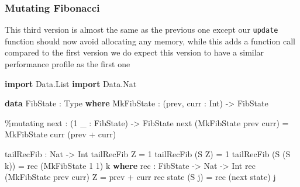\documentclass[
]{article}
\newenvironment{Shaded}{}{}
\newcommand{\DataTypeTok}[1]{\textcolor[rgb]{0.56,0.13,0.00}{#1}}
\newcommand{\DecValTok}[1]{\textcolor[rgb]{0.25,0.63,0.44}{#1}}
\newcommand{\KeywordTok}[1]{\textcolor[rgb]{0.00,0.44,0.13}{\textbf{#1}}}
\newcommand{\NormalTok}[1]{#1}
\newcommand{\OperatorTok}[1]{\textcolor[rgb]{0.40,0.40,0.40}{#1}}
\newcommand{\OtherTok}[1]{\textcolor[rgb]{0.00,0.44,0.13}{#1}}
\begin{document}
\hypertarget{mutating-fibonacci}{%
\subsubsection{Mutating Fibonacci}\label{mutating-fibonacci}}

This third version is almost the same as the previous one except our
\texttt{update} function should now avoid allocating any memory, while
this adds a function call compared to the first version we do expect
this version to have a similar performance profile as the first one

\begin{Shaded}
\begin{Highlighting}[]
\KeywordTok{import} \DataTypeTok{Data.List}
\KeywordTok{import} \DataTypeTok{Data.Nat}

\KeywordTok{data} \DataTypeTok{FibState} \OperatorTok{:} \DataTypeTok{Type} \KeywordTok{where}
  \DataTypeTok{MkFibState} \OperatorTok{:}\NormalTok{ (prev, curr }\OperatorTok{:}  \DataTypeTok{Int}\NormalTok{) }\OtherTok{{-}\textgreater{}} \DataTypeTok{FibState}

\OperatorTok{\%}\NormalTok{mutating}
\NormalTok{next }\OperatorTok{:}\NormalTok{ (}\DecValTok{1}\NormalTok{ \_ }\OperatorTok{:} \DataTypeTok{FibState}\NormalTok{) }\OtherTok{{-}\textgreater{}} \DataTypeTok{FibState}
\NormalTok{next (}\DataTypeTok{MkFibState}\NormalTok{ prev curr) }\OtherTok{=} \DataTypeTok{MkFibState}\NormalTok{ curr (prev }\OperatorTok{+}\NormalTok{ curr)}


\NormalTok{tailRecFib }\OperatorTok{:} \DataTypeTok{Nat} \OtherTok{{-}\textgreater{}} \DataTypeTok{Int}
\NormalTok{tailRecFib }\DataTypeTok{Z} \OtherTok{=} \DecValTok{1}
\NormalTok{tailRecFib (}\DataTypeTok{S} \DataTypeTok{Z}\NormalTok{) }\OtherTok{=} \DecValTok{1}
\NormalTok{tailRecFib (}\DataTypeTok{S}\NormalTok{ (}\DataTypeTok{S}\NormalTok{ k)) }\OtherTok{=}\NormalTok{ rec (}\DataTypeTok{MkFibState} \DecValTok{1} \DecValTok{1}\NormalTok{) k}
  \KeywordTok{where}
\NormalTok{    rec }\OperatorTok{:} \DataTypeTok{FibState} \OtherTok{{-}\textgreater{}} \DataTypeTok{Nat} \OtherTok{{-}\textgreater{}} \DataTypeTok{Int}
\NormalTok{    rec (}\DataTypeTok{MkFibState}\NormalTok{ prev curr) }\DataTypeTok{Z} \OtherTok{=}\NormalTok{ prev }\OperatorTok{+}\NormalTok{ curr}
\NormalTok{    rec state (}\DataTypeTok{S}\NormalTok{ j) }\OtherTok{=}\NormalTok{ rec (next state) j}
\end{Highlighting}
\end{Shaded}
\end{document}
